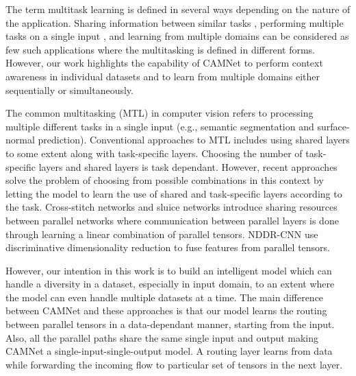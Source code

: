 \documentclass[10pt,twocolumn,letterpaper]{article}
\begin{document}
The term multitask learning is defined in several ways depending on the nature of the application. Sharing information between similar tasks \cite{donahue2014decaf, pentina2015curriculum}, performing multiple tasks on a single input \cite{nddr-cnn,fully-adaptive-mtl, mtl-soft-layer-ordering, cross_stich, routing-networks, sluice,  wang2015designing,pad-net,   zhang2014facial}, and learning from multiple domains \cite{kang2011learning, li2018learning, packnet, residual-adapters} can be considered as few such applications where the multitasking is defined in different forms. However, our work highlights the capability of CAMNet to perform context awareness in individual datasets and to learn from multiple domains either sequentially or simultaneously. 

The common multitasking (MTL) in computer vision refers to processing multiple different tasks in a single input (e.g., semantic segmentation and surface-normal prediction). Conventional approaches to MTL includes using  shared layers to some extent along with  task-specific layers. Choosing the number of task-specific layers and shared layers is task dependant. However, recent approaches solve the problem of choosing from possible combinations in this context by letting the model to learn the use of shared and task-specific layers according to the task. Cross-stitch networks \cite{cross_stich} and sluice networks \cite{sluice} introduce sharing resources between parallel networks where communication between parallel layers is done through learning a linear combination of parallel tensors. NDDR-CNN \cite{nddr-cnn} use discriminative dimensionality reduction to fuse features from parallel tensors. 

However, our intention in this work is to build an intelligent model which can handle a diversity in a dataset, especially in input domain, to an extent where the model can even handle multiple datasets at a time. The main difference between CAMNet and these approaches is that our model learns the routing between parallel tensors in a data-dependant manner, starting from the input. Also, all the parallel paths share the same single input and output making CAMNet a single-input-single-output model. A routing layer learns from data while forwarding the incoming flow to particular set of tensors in the next layer.
\end{document}
